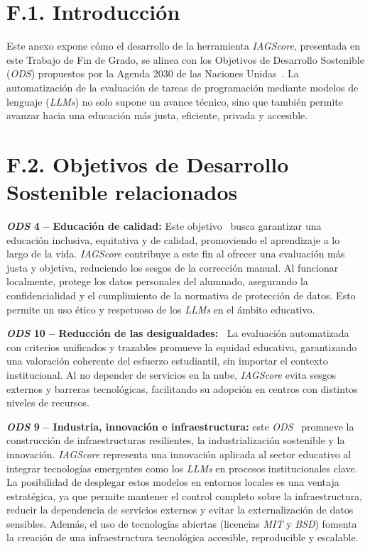
\section*{F.1. Introducción}
Este anexo expone cómo el desarrollo de la herramienta \textit{IAGScore}, presentada en este Trabajo de Fin de Grado, se alinea con los Objetivos de Desarrollo Sostenible (\textit{ODS}) propuestos por la Agenda 2030 de las Naciones Unidas~\cite{web:agenda2030}. La automatización de la evaluación de tareas de programación mediante modelos de lenguaje (\textit{LLMs}) no solo supone un avance técnico, sino que también permite avanzar hacia una educación más justa, eficiente, privada y accesible.

\section*{F.2. Objetivos de Desarrollo Sostenible relacionados}

\textbf{\textit{ODS} 4 – Educación de calidad:}
Este objetivo~\cite{wiki:ods4} busca garantizar una educación inclusiva, equitativa y de calidad, promoviendo el aprendizaje a lo largo de la vida. \textit{IAGScore} contribuye a este fin al ofrecer una evaluación más justa y objetiva, reduciendo los sesgos de la corrección manual. Al funcionar localmente, protege los datos personales del alumnado, asegurando la confidencialidad y el cumplimiento de la normativa de protección de datos. Esto permite un uso ético y respetuoso de los \textit{LLMs} en el ámbito educativo.

\textbf{\textit{ODS} 10 – Reducción de las desigualdades:~\cite{wiki:ods10}}
La evaluación automatizada con criterios unificados y trazables promueve la equidad educativa, garantizando una valoración coherente del esfuerzo estudiantil, sin importar el contexto institucional. Al no depender de servicios en la nube, \textit{IAGScore} evita sesgos externos y barreras tecnológicas, facilitando su adopción en centros con distintos niveles de recursos.

\textbf{\textit{ODS} 9 – Industria, innovación e infraestructura:}  
este \textit{ODS}~\cite{wiki:ods9} promueve la construcción de infraestructuras resilientes, la industrialización sostenible y la innovación. \textit{IAGScore} representa una innovación aplicada al sector educativo al integrar tecnologías emergentes como los \textit{LLMs} en procesos institucionales clave. La posibilidad de desplegar estos modelos en entornos locales es una ventaja estratégica, ya que permite mantener el control completo sobre la infraestructura, reducir la dependencia de servicios externos y evitar la externalización de datos sensibles. Además, el uso de tecnologías abiertas (licencias \textit{MIT} y \textit{BSD}) fomenta la creación de una infraestructura tecnológica accesible, reproducible y escalable.

